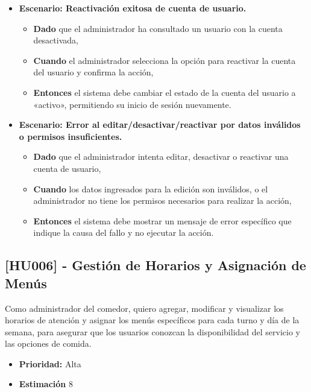 \documentclass[12pt]{article}
\begin{document}
\begin{itemize}
	\item \textbf{Escenario: Reactivación exitosa de cuenta de usuario.}
	\begin{itemize}
		\item \textbf{Dado} que el administrador ha consultado un usuario con la cuenta desactivada,
		\item \textbf{Cuando} el administrador selecciona la opción para reactivar la cuenta del usuario y confirma la acción,
		\item \textbf{Entonces} el sistema debe cambiar el estado de la cuenta del usuario a «activo», permitiendo su inicio de sesión nuevamente.
	\end{itemize}

	\item \textbf{Escenario: Error al editar/desactivar/reactivar por datos inválidos o permisos insuficientes.}
	\begin{itemize}
		\item \textbf{Dado} que el administrador intenta editar, desactivar o reactivar una cuenta de usuario,
		\item \textbf{Cuando} los datos ingresados para la edición son inválidos, o el administrador no tiene los permisos necesarios para realizar la acción,
		\item \textbf{Entonces} el sistema debe mostrar un mensaje de error específico que indique la causa del fallo y no ejecutar la acción.
	\end{itemize}
\end{itemize}

\pagebreak

\subsection{[HU006] - Gestión de Horarios y Asignación de Menús}

Como administrador del comedor, quiero agregar, modificar y visualizar los horarios de atención y asignar los menús específicos para cada turno y día de la semana, para asegurar que los usuarios conozcan la disponibilidad del servicio y las opciones de comida.

\begin{itemize}
	\item \textbf{Prioridad:} Alta
	\item \textbf{Estimación} 8
\end{itemize}
\end{document}
